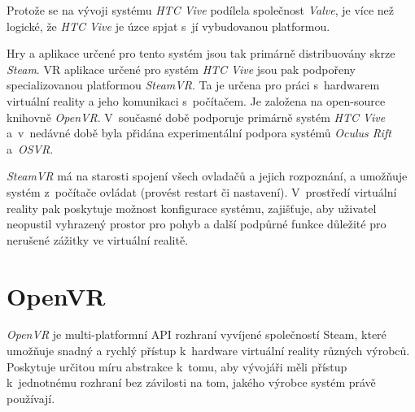 Protože se na vývoji systému \emph{HTC Vive} podílela společnost
\emph{Valve}, je více než logické, že \emph{HTC Vive} je úzce spjat
s~jí vybudovanou platformou.

Hry a aplikace určené pro tento systém jsou tak primárně distribuovány skrze \emph{Steam}. VR aplikace určené pro systém \emph{HTC Vive}
jsou pak podpořeny specializovanou platformou \emph{SteamVR}. Ta je
určena pro práci s~hardwarem virtuální reality a jeho komunikaci
s~počítačem. Je založena na open-source knihovně \emph{OpenVR}. V~současné
době podporuje primárně systém \emph{HTC Vive} a~v~nedávné době byla
přidána experimentální podpora systémů \emph{Oculus Rift} a~\emph{OSVR}. \autocite{steamvrsupports}

\emph{SteamVR} má na starosti spojení všech ovladačů a jejich
rozpoznání, a umožňuje systém z~počítače ovládat (provést restart či
nastavení). V~prostředí virtuální reality pak poskytuje možnost
konfigurace systému, zajišťuje, aby uživatel neopustil vyhrazený prostor
pro pohyb a další podpůrné funkce důležité pro nerušené zážitky ve
virtuální realitě.

\section{OpenVR}\label{openvr}

\emph{OpenVR} je multi-platformní API rozhraní vyvíjené společností Steam,
které umožňuje snadný a rychlý přístup k~hardware virtuální reality
různých výrobců. Poskytuje určitou míru abstrakce k~tomu, aby vývojáři
měli přístup k~jednotnému rozhraní bez závilosti na tom, jakého výrobce
systém právě používají.
